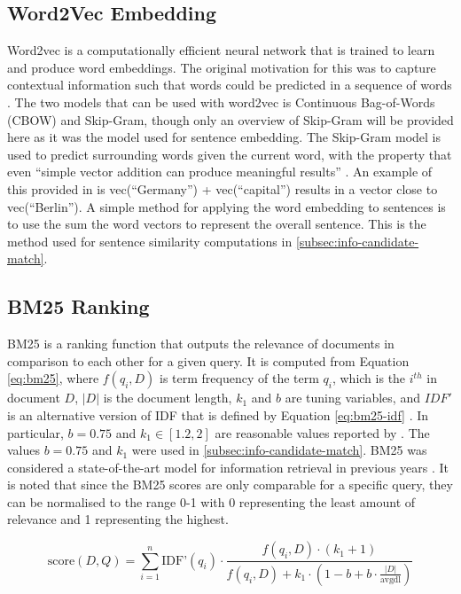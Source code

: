 \subsection{Word2Vec Embedding}
\label{subsec:info-w2v}
Word2vec is a computationally efficient neural network that is trained to learn and produce word embeddings. The original motivation for this was to capture contextual information such that words could be predicted in a sequence of words \cite{mikolov2013efficient}. The two models that can be used with word2vec is Continuous Bag-of-Words (CBOW) and Skip-Gram, though only an overview of Skip-Gram will be provided here as it was the model used for sentence embedding. The Skip-Gram model is used to predict surrounding words given the current word, with the property that even ``simple vector addition can produce meaningful results'' \cite{mikolov2013distributed}. An example of this provided in \cite{mikolov2013distributed} is vec(``Germany'') + vec(``capital'') results in a vector close to vec(``Berlin''). A simple method for applying the word embedding to sentences is to use the sum the word vectors to represent the overall sentence. This is the method used for sentence similarity computations in \ref{subsec:info-candidate-match}.

\subsection{BM25 Ranking}
\label{subsec:info-bm25}
BM25 is a ranking function that outputs the relevance of documents in comparison to each other for a given query. It is computed from Equation \ref{eq:bm25}, where $f(q_i, D)$ is term frequency of the term $q_i$, which is the $i^{th}$ in document $D$, $|D|$ is the document length, $k_1$ and $b$ are tuning variables, and $IDF'$ is an alternative version of IDF that is defined by Equation \ref{eq:bm25-idf} \cite{Manning:2008:IIR:1394399}. In particular, $b=0.75$ and $k_1 \in [1.2,2]$ are reasonable values reported by \citeauthor{Manning:2008:IIR:1394399}. The values $b=0.75$ and $k_1$ were used in \ref{subsec:info-candidate-match}. BM25 was considered a state-of-the-art model for information retrieval in previous years \cite{perez2009integrating}. It is noted that since the BM25 scores are only comparable for a specific query, they can be normalised to the range 0-1 with 0 representing the least amount of relevance and 1 representing the highest.

\begin{equation} \label{eq:bm25} 
\text{score}(D,Q) = \sum_{i=1}^{n} \text{IDF'}(q_i) \cdot \frac{f(q_i, D) \cdot (k_1 + 1)}{f(q_i, D) + k_1 \cdot (1 - b + b \cdot \frac{|D|}{\text{avgdl}})} 
\end{equation}

